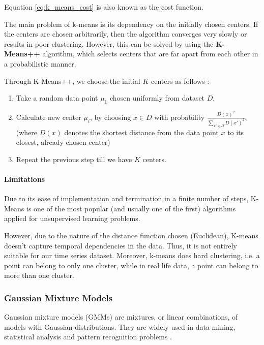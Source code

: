 Equation \eqref{eq:k_means_cost} is also known as the cost function.

The main problem of k-means is its dependency on the initially chosen centers. If the centers are chosen arbitrarily, then the algorithm converges very slowly or results in poor clustering. However, this can be solved by using the \textbf{K-Means++} \cite{arthur2007k} algorithm, which selects centers that are far apart from each other in a probabilistic manner. 

Through K-Means++, we choose the initial $K$ centers as follows \cite{TanVYF}:-

\begin{enumerate}
    \item Take a random data point $\mu_1$ chosen uniformly from dataset $D$.
    \item Calculate new center $\mu_i$, by choosing $x \in D$ with probability $\frac{D(x)^2}{\sum_{x' \in D} D(x')^2}$, (where $D(x)$ denotes the shortest distance from the data point $x$ to its closest, already chosen center)
    \item Repeat the previous step till we have $K$ centers.
\end{enumerate}

\paragraph{Limitations}
Due to its ease of implementation and termination in a finite number of steps, K-Means is one of the most popular (and usually one of the first) algorithms applied for unsupervised learning problems. 

However, due to the nature of the distance function chosen (Euclidean), K-means doesn't capture temporal dependencies in the data. Thus, it is not entirely suitable for our time series dataset. Moreover, k-means does hard clustering, i.e. a point can belong to only one cluster, while in real life data, a point can belong to more than one cluster.

\subsubsection{Gaussian Mixture Models}

Gaussian mixture models (GMMs) are mixtures, or linear combinations, of models with Gaussian distributions. They are widely used in data mining, statistical analysis and pattern recognition problems \cite{bishop2006pattern}. 


